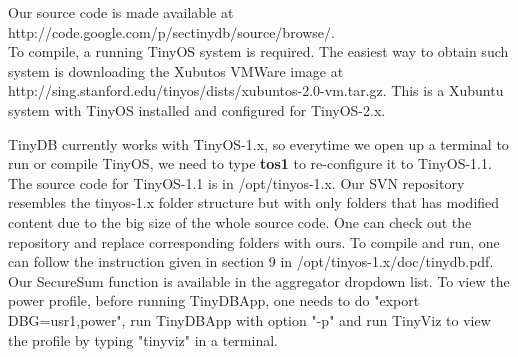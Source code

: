 \documentclass[a4paper]{article}
\begin{document}
Our source code is made available at \\
http://code.google.com/p/sectinydb/source/browse/.\\
To compile, a running
TinyOS system is required. The easiest way to obtain such system is downloading
the Xubutos VMWare image at\\
http://sing.stanford.edu/tinyos/dists/xubuntos-2.0-vm.tar.gz.
This is a Xubuntu system with TinyOS installed and configured for TinyOS-2.x.

TinyDB currently works with TinyOS-1.x, so everytime we open up a terminal
to run or compile TinyOS, we need to type \textbf{tos1} to re-configure it to 
TinyOS-1.1. The source code for TinyOS-1.1 is in /opt/tinyos-1.x. Our SVN
repository resembles the tinyos-1.x folder structure but with only folders that
has modified content due to the big size of the whole source code. One can check
out the repository and replace corresponding folders with ours. To compile and run,
one can follow the instruction given in section 9 in /opt/tinyos-1.x/doc/tinydb.pdf.
Our SecureSum function is available in the aggregator dropdown list. To view
the power profile, before running TinyDBApp, one needs to do "export DBG=usr1,power", 
run TinyDBApp with option "-p" and run TinyViz to view the profile
by typing "tinyviz" in a terminal. 




\end{document}
